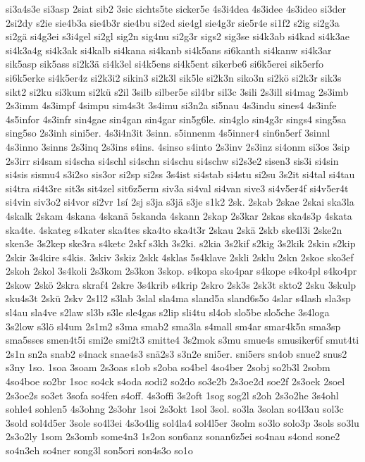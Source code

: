 {si3a4s3e
si3asp
2siat
sib2
3sic
sichts5te
sicker5e
4s3i4dea
4s3idee
4s3ideo
si3der
2si2dy
s2ie
sie4b3a
sie4b3r
sie4bu
si2ed
sie4gl
sie4g3r
sie5r4e
si1f2
s2ig
si2g3a
si2gä
si4g3ei
s3i4gel
si2gl
sig2n
sig4nu
si2g3r
sigs2
sig3se
si4k3ab
si4kad
si4k3ae
si4k3a4g
si4k3ak
si4kalb
si4kana
si4kanb
si4k5ans
si6kanth
si4kanw
si4k3ar
sik5asp
sik5ass
si2k3ä
si4k3el
si4k5ens
si4k5ent
sikerbe6
si6k5erei
sik5erfo
si6k5erke
si4k5er4z
si2k3i2
sikin3
si2k3l
sik5le
si2k3n
siko3n
si2kö
si2k3r
sik3s
sikt2
si2ku
si3kum
si2kü
s2il
3silb
silber5e
sil4br
sil3c
3sili
2s3ill
si4mag
2s3imb
2s3imm
4s3impf
4simpu
sim4s3t
3s4imu
si3n2a
si5nau
4s3indu
sines4
4s3infe
4s5infor
4s3infr
sin4gae
sin4gan
sin4gar
sin5g6le.
sin4glo
sin4g3r
sings4
sing5sa
sing5so
2s3inh
sini5er.
4s3i4n3it
3sinn.
s5innenm
4s5inner4
sin6n5erf
3sinnl
4s3inno
3sinns
2s3inq
2s3ins
s4ins.
4sinso
s4into
2s3inv
2s3inz
si4onm
si3os
3sip
2s3irr
si4sam
si4scha
si4schl
si4schn
si4schu
si4schw
si2s3e2
sisen3
sis3i
si4sin
si4sis
sismu4
s3i2so
sis3or
si2sp
si2ss
3s4ist
si4stab
si4stu
si2su
3s2it
si4tal
si4tau
si4tra
si4t3re
sit3s
sit4zel
sit6z5erm
siv3a
si4val
si4van
sive3
si4v5er4f
si4v5er4t
si4vin
siv3o2
si4vor
si2vr
1sí
2sj
s3ja
s3jä
s3je
s1k2
2sk.
2skab
2skae
2skai
ska3la
4skalk
2skam
4skana
4skanä
5skanda
4skann
2skap
2s3kar
2skas
ska4s3p
4skata
ska4te.
4skateg
s4kater
ska4tes
ska4to
ska4t3r
2skau
2skä
2skb
ske4l3i
2ske2n
sken3e
3s2kep
ske3ra
s4ketc
2skf
s3kh
3s2ki.
s2kia
3s2kif
s2kig
3s2kik
2skin
s2kip
2skir
3s4kire
s4kis.
3skiv
3skiz
2skk
4sklas
5s4klave
2skli
2sklu
2skn
2skoe
sko3ef
2skoh
2skol
3s4koli
2s3kom
2s3kon
3skop.
s4kopa
sko4par
s4kope
s4ko4pl
s4ko4pr
2skow
2skö
2skra
skraf4
2skre
3s4krib
s4krip
2skro
2sk3s
2sk3t
skto2
2sku
3skulp
sku4s3t
2skü
2skv
2s1l2
s3lab
3slal
sla4ma
sland5a
sland6s5o
4slar
s4lash
sla3sp
sl4au
sla4ve
s2law
sl3b
s3le
sle4gas
s2lip
sli4tu
sl4ob
slo5be
slo5che
3s4loga
3s2low
s3lö
sl4um
2s1m2
s3ma
smab2
sma3la
s4mall
sm4ar
smar4k5n
sma3sp
sma5sses
smen4t5i
smi2e
smi2t3
smitte4
3s2mok
s3mu
smue4s
smusiker6f
smut4ti
2s1n
sn2a
snab2
s4nack
snae4s3
snä2s3
s3n2e
sni5er.
sni5ers
sn4ob
snue2
snus2
s3ny
1so.
1soa
3soam
2s3oas
s1ob
s2oba
so4bel
4so4ber
2sobj
so2b3l
2sobm
4so4boe
so2br
1soc
so4ck
s4oda
sodi2
so2do
so3e2b
2s3oe2d
soe2f
2s3oek
2soel
2s3oe2s
so3et
3sofa
so4fen
s4off.
4s3offi
3s2oft
1sog
sog2l
s2oh
2s3o2he
3s4ohl
sohle4
sohlen5
4s3ohng
2s3ohr
1soi
2s3okt
1sol
3sol.
so3la
3solan
so4l3au
sol3c
3sold
sol4d5er
3sole
so4l3ei
4s3o4lig
sol4la4
sol4l5er
3solm
so3lo
solo3p
3sols
so3lu
2s3o2ly
1som
2s3omb
some4n3
1s2on
son6anz
sonan6z5ei
so4nau
s4ond
sone2
so4n3eh
so4ner
song3l
son5ori
son4s3o
so1o
}
